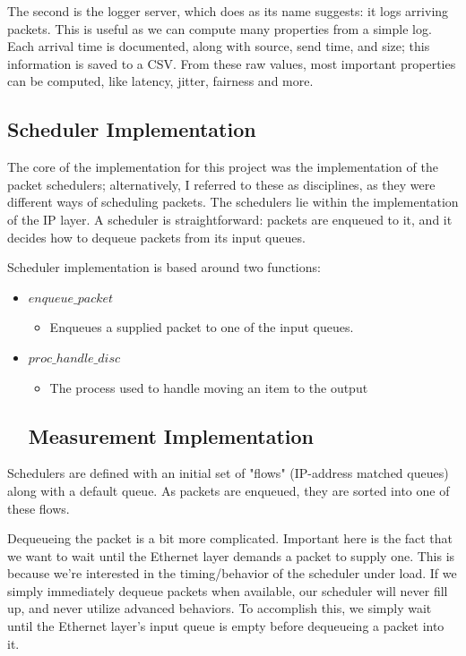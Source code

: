 \documentclass[conference]{IEEEtran}
\begin{document}
The second is the logger server, which does as its name suggests: it logs arriving packets.
This is useful as we can compute many properties from a simple log.
Each arrival time is documented, along with source, send time, and size; this information is saved to a CSV.
From these raw values, most important properties can be computed, like latency, jitter, fairness and more.

    \subsection{Scheduler Implementation}
The core of the implementation for this project was the implementation of the packet schedulers; alternatively, I referred
to these as disciplines, as they were different ways of scheduling packets.
The schedulers lie within the implementation of the IP layer.
A scheduler is straightforward: packets are enqueued to it, and it decides how to dequeue packets from its input queues.

Scheduler implementation is based around two functions:
\begin{itemize}
    \item $enqueue\_packet$
    \begin{itemize}
        \item Enqueues a supplied packet to one of the input queues.
    \end{itemize}
    \item $proc\_handle\_disc$
    \begin{itemize}
        \item The process used to handle moving an item to the output
    \end{itemize}
    \subsection{Measurement Implementation}
\end{itemize}

Schedulers are defined with an initial set of "flows" (IP-address matched queues) along with a default queue.
As packets are enqueued, they are sorted into one of these flows.

Dequeueing the packet is a bit more complicated.
Important here is the fact that we want to wait until the Ethernet layer demands a packet to supply one.
This is because we're interested in the timing/behavior of the scheduler under load.
If we simply immediately dequeue packets when available, our scheduler will never fill up, and never utilize advanced
behaviors.
To accomplish this, we simply wait until the Ethernet layer's input queue is empty before dequeueing a packet into it.
\end{document}
